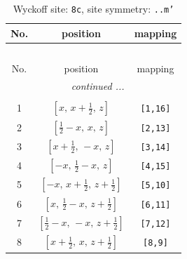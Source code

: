 \documentclass[fleqn,8pt]{jsarticle}
\begin{document}
\renewcommand{\arraystretch}{1.2}
\begin{longtable}{ccc}
\caption{Wyckoff site: {\tt 8c}, site symmetry: {\tt ..m'}}
 \\
 \hline \hline
No. & position & mapping \\ \hline \endfirsthead

\multicolumn{2}{l}{\tablename\ \thetable{}} \\
 \hline \hline
No. & position & mapping \\ \hline \endhead

 \hline \hline
\multicolumn{2}{r}{\footnotesize\it continued ...} \\ \endfoot

 \hline \hline
\multicolumn{2}{r}{} \\ \endlastfoot

1 & $\left[ x,\, x + \frac{1}{2},\, z \right]$ & {\tt [1,16]} \\ \hline
2 & $\left[ \frac{1}{2} - x,\, x,\, z \right]$ & {\tt [2,13]} \\ \hline
3 & $\left[ x + \frac{1}{2},\, - x,\, z \right]$ & {\tt [3,14]} \\ \hline
4 & $\left[ - x,\, \frac{1}{2} - x,\, z \right]$ & {\tt [4,15]} \\ \hline
5 & $\left[ - x,\, x + \frac{1}{2},\, z + \frac{1}{2} \right]$ & {\tt [5,10]} \\ \hline
6 & $\left[ x,\, \frac{1}{2} - x,\, z + \frac{1}{2} \right]$ & {\tt [6,11]} \\ \hline
7 & $\left[ \frac{1}{2} - x,\, - x,\, z + \frac{1}{2} \right]$ & {\tt [7,12]} \\ \hline
8 & $\left[ x + \frac{1}{2},\, x,\, z + \frac{1}{2} \right]$ & {\tt [8,9]} \\
\end{longtable}
\renewcommand{\arraystretch}{1.2}
\end{document}
